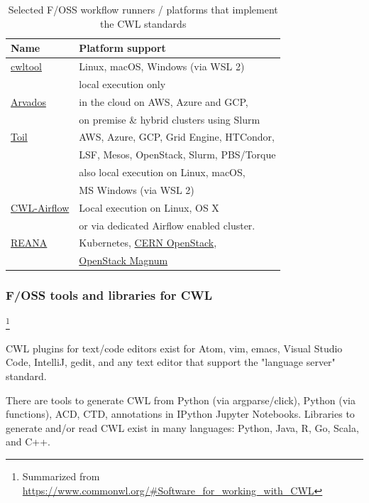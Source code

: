 \documentclass[sigconf,authordraft]{acmart}
\begin{document}
\begin{table}
  \caption{Selected F/OSS workflow runners / platforms that implement the CWL standards}
  \label{tab:runners}
    \begin{tabular}{ll}
      \toprule
      Name & Platform support\\
      \midrule
      \href{https://pypi.org/project/cwltool}{cwltool} & Linux, macOS, Windows (via WSL 2) \\
      & local execution only\\
      \href{https://arvados.org}{Arvados} & in the cloud on AWS, Azure and GCP, \\
      & on premise \& hybrid clusters using Slurm\\
      \href{https://pypi.org/project/toil-cwl-runner}{Toil} & AWS, Azure, GCP, Grid Engine, HTCondor, \\
      & LSF, Mesos, OpenStack, Slurm, PBS/Torque\\
      & also local execution on Linux, macOS, \\
      & MS Windows (via WSL 2)\\
      \href{https://pypi.org/project/cwl-airflow}{CWL-Airflow} & Local execution on Linux, OS X\\
      & or via dedicated Airflow enabled cluster.\\
      \href{https://docs.reana.io/}{REANA} & Kubernetes, \href{https://clouddocs.web.cern.ch/clouddocs/containers/}{CERN OpenStack},\\
      & \href{https://wiki.openstack.org/wiki/Magnum}{OpenStack Magnum}\\
      \bottomrule
\end{tabular}
\end{table}

\subsubsection{F/OSS tools and libraries for CWL}\footnote{Summarized from \url{https://www.commonwl.org/\#Software_for_working_with_CWL}}

CWL plugins for text/code editors exist for Atom, vim, emacs, Visual Studio Code, IntelliJ, gedit, and any text editor that support the "language server" standard.

There are tools to generate CWL from Python (via argparse/click), Python (via functions), ACD, CTD, annotations in IPython Jupyter Notebooks. Libraries to generate and/or read CWL exist in many languages: Python, Java, R, Go, Scala, and C++.
\end{document}
